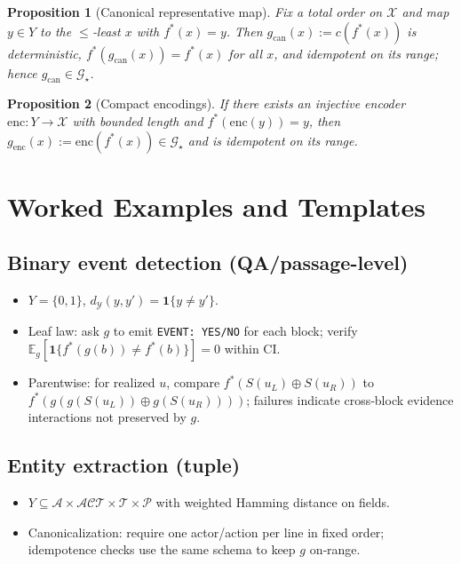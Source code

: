 \documentclass[11pt]{article}
\newtheorem{proposition}{Proposition}
\newcommand{\Strings}{\mathcal{X}}       %
\newcommand{\Y}{\mathcal{Y}}               %
\newcommand{\fstar}{f^*}               %
\newcommand{\E}{\mathbb{E}}
\newcommand{\concat}{\oplus}                    %
\newcommand{\metric}{d_{\Y}}
\newcommand{\Eg}{\E_g}     %
\begin{document}
\begin{proposition}[Canonical representative map]
\label{prop:canonical2}
Fix a total order on $\Strings$ and map $y\in Y$ to the $\le$‑least $x$ with $\fstar(x)=y$. Then $g_{\text{can}}(x):=c(\fstar(x))$ is deterministic, $\fstar(g_{\text{can}}(x))=\fstar(x)$ for all $x$, and idempotent on its range; hence $g_{\text{can}}\in\mathcal G_\star$.
\end{proposition}

\begin{proposition}[Compact encodings]
\label{prop:encoding2}
If there exists an injective encoder $\mathrm{enc}:Y\to \Strings$ with bounded length and $\fstar(\mathrm{enc}(y))=y$, then $g_{\text{enc}}(x):=\mathrm{enc}(\fstar(x))\in\mathcal G_\star$ and is idempotent on its range.
\end{proposition}



\section{Worked Examples and Templates}
\label{sec:example}

\subsection{Binary event detection (QA/passage-level)}
\begin{itemize}
  \item $Y=\{0,1\}$, $\metric(y,y')=\mathbf 1\{y\neq y'\}$.
  \item Leaf law: ask $g$ to emit \texttt{EVENT: YES/NO} for each block; verify $\Eg[\mathbf 1\{\fstar(g(b))\neq \fstar(b)\}]=0$ within CI.
  \item Parentwise: for realized $u$, compare $\fstar(S(u_L)\concat S(u_R))$ to $\fstar(g(g(S(u_L))\concat g(S(u_R))))$; failures indicate cross‑block evidence interactions not preserved by $g$.
\end{itemize}

\subsection{Entity extraction (tuple)}
\begin{itemize}
  \item $Y\subseteq\mathcal A\times\mathcal{ACT}\times\mathcal T\times\mathcal P$ with weighted Hamming distance on fields.
  \item Canonicalization: require one actor/action per line in fixed order; idempotence checks use the same schema to keep $g$ on‑range.
\end{itemize}
\end{document}
